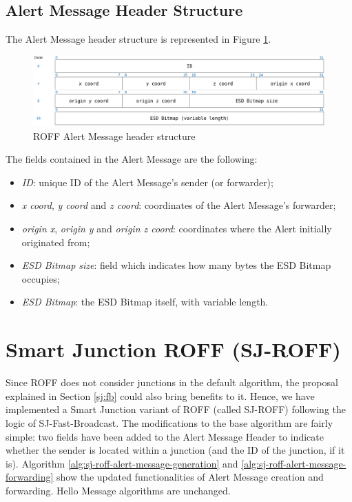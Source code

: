 		\subsection{Alert Message Header Structure}
			The Alert Message header structure is represented in Figure \ref{fig:roffAlertHeader}.
			
			\begin{figure}[H]
				\centering
				\includegraphics[width=\textwidth]{immagini/roffAlertHeader}
				\caption{ROFF Alert Message header structure}
				\label{fig:roffAlertHeader}
			\end{figure}
			
			The fields contained in the Alert Message are the following:
			\begin{itemize}
				\item \textit{ID}: unique ID of the Alert Message's sender (or forwarder);
				\item \textit{x coord}, \textit{y coord} and \textit{z coord}: coordinates of the Alert Message's forwarder;
				\item \textit{origin x}, \textit{origin y} and \textit{origin z coord}: coordinates where the Alert initially originated from;
				\item \textit{ESD Bitmap size}: field which indicates how many bytes the ESD Bitmap occupies;
				\item \textit{ESD Bitmap}: the ESD Bitmap itself, with variable length.
			\end{itemize}
	
	\section{Smart Junction ROFF (SJ-ROFF)}
		Since ROFF does not consider junctions in the default algorithm, the proposal explained in Section \ref{sj:fb} could also bring benefits to it. Hence, we have implemented a Smart Junction variant of ROFF (called SJ-ROFF) following the logic of SJ-Fast-Broadcast. The modifications to the base algorithm are fairly simple: two fields have been added to the Alert Message Header to indicate whether the sender is located within a junction (and the ID of the junction, if it is). Algorithm \ref{alg:sj-roff-alert-message-generation} and \ref{alg:sj-roff-alert-message-forwarding} show the updated functionalities of Alert Message creation and forwarding. Hello Message algorithms are unchanged.
		
